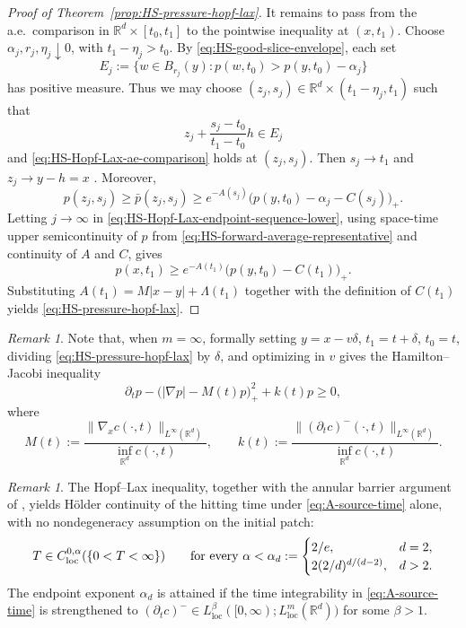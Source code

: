\documentclass[11pt]{amsart}
\numberwithin{equation}{section}
\numberwithin{figure}{section}
\theoremstyle{plain}
\theoremstyle{definition}
\theoremstyle{remark}
\newtheorem{rem}[thm]{Remark}
\theoremstyle{plain}
\newcommand{\abs}[1]{\lvert #1 \rvert}
\newcommand{\norm}[1]{\lVert #1 \rVert}
\def\R{\mathbb{R}}
\begin{document}
\begin{proof}[Proof of Theorem~\ref{prop:HS-pressure-hopf-lax}]
It remains to pass from the a.e.\ comparison in
\(\R^d\times[t_0,t_1]\) to the pointwise inequality at \((x,t_1)\).  Choose
\(\alpha_j,r_j,\eta_j\downarrow0\), with \(t_1-\eta_j>t_0\).  By
\eqref{eq:HS-good-slice-envelope}, each set
\[
    E_j:=\{w\in B_{r_j}(y):p(w,t_0)>p(y,t_0)-\alpha_j\}
\]
has positive measure.  Thus we may choose
\((z_j,s_j)\in\R^d\times(t_1-\eta_j,t_1)\) such that
\[
    z_j+\frac{s_j-t_0}{t_1-t_0}h\in E_j
\]
and \eqref{eq:HS-Hopf-Lax-ae-comparison} holds at \((z_j,s_j)\).  Then
\(s_j\to t_1\) and \(z_j\to y-h=x\) .  Moreover,
\begin{equation}\label{eq:HS-Hopf-Lax-endpoint-sequence-lower}
    p(z_j,s_j)\geq \bar p(z_j,s_j)
    \geq
    e^{-A(s_j)}
    \bigl(p(y,t_0)-\alpha_j-C(s_j)\bigr)_+ .
\end{equation}
Letting \(j\to\infty\) in
\eqref{eq:HS-Hopf-Lax-endpoint-sequence-lower}, using space-time upper semicontinuity of
\(p\) from \eqref{eq:HS-forward-average-representative} and continuity of \(A\) and \(C\), gives
\[
    p(x,t_1)\geq e^{-A(t_1)}\bigl(p(y,t_0)-C(t_1)\bigr)_+ .
\]
Substituting \(A(t_1)=M\abs{x-y}+\Lambda(t_1)\) together with the
definition of \(C(t_1)\) yields \eqref{eq:HS-pressure-hopf-lax}.
\end{proof}

\begin{rem}\label{rem:HS-Hopf-Lax-HJ}
Note that, when \(m=\infty\), formally setting \(y=x-v\delta\), \(t_1=t+\delta\),
\(t_0=t\), dividing \eqref{eq:HS-pressure-hopf-lax} by \(\delta\), and
optimizing in \(v\) gives the Hamilton--Jacobi inequality
\begin{equation}\label{eq:HS-formal-HJ}
    \partial_t p-\bigl(\abs{\nabla p}-M(t)p\bigr)_+^2+k(t)p\geq0,
\end{equation}
where
\[
    M(t):=\frac{\norm{\nabla_x c(\cdot,t)}_{L^\infty(\R^d)}}
    {\inf_{\R^d}c(\cdot,t)},
    \qquad
    k(t):=\frac{\norm{(\partial_t c)^-(\cdot,t)}_{L^\infty(\R^d)}}
    {\inf_{\R^d}c(\cdot,t)} .
\]

\end{rem}

\begin{rem}\label{rem:HS-hitting-time-holder}
The Hopf--Lax inequality, together with the annular barrier argument of
\cite[Lem.~4.1, Thm.~4.2]{CJK25}, yields H\"older continuity of the hitting time under
\eqref{eq:A-source-time} alone, with no nondegeneracy assumption on the initial patch:
\[T\in C^{0,\alpha}_{\mathrm{loc}}(\{0<T<\infty\})
\qquad\hbox{for every }\alpha<\alpha_d:=
\begin{cases}
2/e, & d=2,\\
2(2/d)^{d/(d-2)}, & d>2.
\end{cases}\]
The endpoint exponent \(\alpha_d\) is attained if the time integrability in
\eqref{eq:A-source-time} is strengthened to
\((\partial_t c)^-\in L_{\operatorname{loc}}^\beta([0,\infty);L_{\operatorname{loc}}^m(\R^d))\)
for some \(\beta>1\).
\end{rem}
\end{document}
